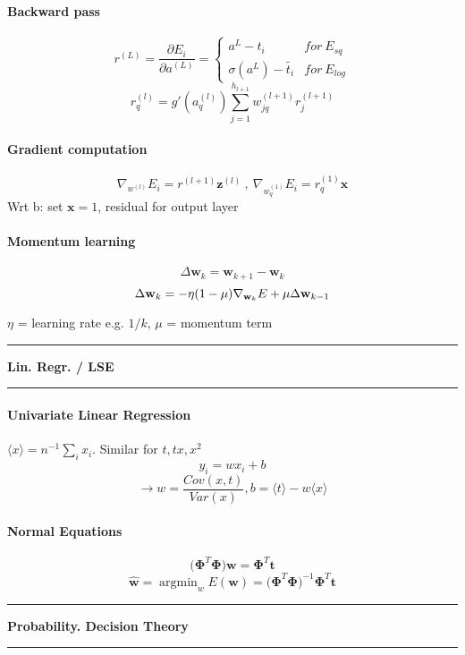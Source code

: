 \documentclass[7pt]{scrartcl}
\newlength{\secskip}
\renewcommand{\section}[1]{
  \vspace{\secskip}
  \hrule\vspace{.3em}
  \textbf{#1}
  \vspace{.3em}
  \hrule
  \vspace{\secskip}
}
\DeclareMathOperator*{\argmin}{argmin}
\renewcommand{\vec}{\mathbf}
\begin{document}
\begin{multicols}{4}
\paragraph{Backward pass}
\[r^{(L)}=\frac{\partial E_i}{\partial a^{(L)}} = \left\{ \begin{array}{ll}a^L - t_i & for~ E_{sq}  \\ \sigma(a^L) - \tilde{t_i} & for~ E_{log} \end{array} \right. \]
\[r_q^{(l)}=g'(a_q^{(l)})\sum_{j=1}^{h_{l+1}}w_{jq}^{(l+1)}r_j^{(l+1)}\]

\paragraph{Gradient computation}
\[\nabla_{w^{(l)}} E_i = r^{(l+1)} \vec{z}^{(l)} ~,~\nabla_{w_q^{(1)}} E_i = r_q^{(1)} \vec{x}\]
Wrt b: set $\vec{x} = 1$, residual for output layer

\paragraph{Momentum learning}
\[\Delta \vec w_k = \vec w_{k+1}-\vec w_k\]
\[\Delta \vec w_k = -\eta(1-\mu)\nabla_{\textbf w_k}E+\mu \Delta \vec w_{k-1}\]

$\eta$ = learning rate e.g. $1/k$, $\mu$ = momentum term

\section{Lin. Regr. / LSE}
\paragraph{Univariate Linear Regression}
$\langle x \rangle = n^{-1} \sum_i x_i $. Similar for $t, tx, x^2$
\[y_i = wx_i + b \]
\[\rightarrow w=\frac{Cov(x,t)}{Var(x)}, b=\langle t \rangle - w \langle x \rangle \]

\paragraph{Normal Equations}
\[ \vec{(\Phi}^{T}\vec{\Phi) w = \Phi}^{T} \vec{t}\]
\[ \hat{\vec{w}} = \argmin_w E(\vec{w}) = \vec{(\Phi}^{T}\vec{\Phi)}^{-1} \vec{\Phi}^{T}  \vec{t} \]

\section{Probability. Decision Theory}

\end{multicols}
\end{document}
